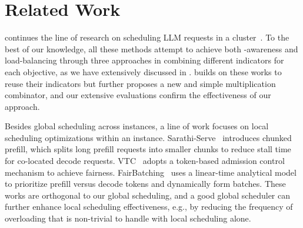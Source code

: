 \section{Related Work}
\label{sec:related}

{\sys} continues the line of research on scheduling LLM requests in a cluster~\cite{vllm,DBLP:journals/corr/abs-2506-05871,DBLP:conf/iclr/SrivatsaHAL025,
305212,DBLP:journals/corr/abs-2507-17769,llm-d}.
To the best of our knowledge, all these methods attempt
to achieve both {\kvcache}-awareness and load-balancing
through three approaches in combining different indicators for each objective,
as we have extensively discussed in \textsection{\ref{sec:principles}}.
{\sys} builds on these works to reuse their indicators but further
proposes a new and simple multiplication combinator,
and our extensive evaluations confirm the effectiveness of our approach.

Besides global scheduling across instances,
a line of work focuses on local scheduling optimizations within an instance.
Sarathi-Serve~\cite{298679} introduces chunked prefill, which splits long prefill requests into smaller chunks
to reduce stall time for co-located decode requests.
VTC~\cite{DBLP:conf/osdi/0007CLZ0ZGS24} adopts a token-based admission control mechanism
to achieve fairness.
FairBatching~\cite{DBLP:journals/corr/abs-2510-14392} uses a linear-time analytical model
to prioritize prefill versus decode tokens and dynamically form batches.
These works are orthogonal to our global scheduling, and
a good global scheduler can further enhance local scheduling effectiveness,
e.g., by reducing the frequency of overloading that is non-trivial to handle with local scheduling alone.

